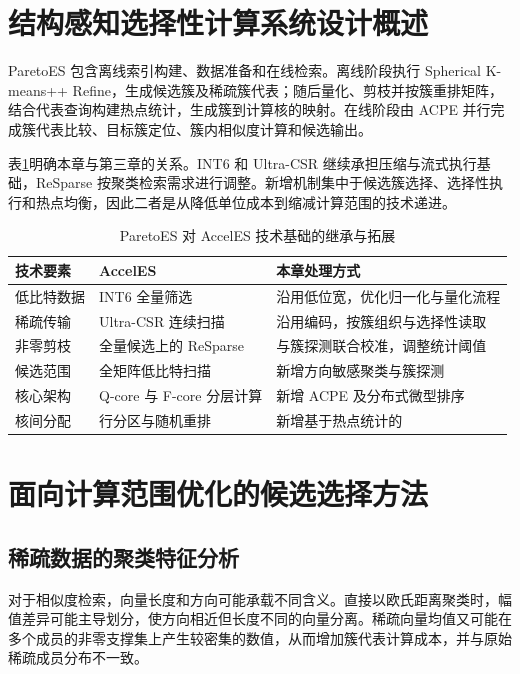 \section{结构感知选择性计算系统设计概述}
ParetoES 包含离线索引构建、数据准备和在线检索。离线阶段执行 Spherical K-means++ Refine，生成候选簇及稀疏簇代表；随后量化、剪枝并按簇重排矩阵，结合代表查询构建热点统计，生成簇到计算核的映射。在线阶段由 ACPE 并行完成簇代表比较、目标簇定位、簇内相似度计算和候选输出。


表\ref{tab:inheritance}明确本章与第三章的关系。INT6 和 Ultra-CSR 继续承担压缩与流式执行基础，ReSparse 按聚类检索需求进行调整。新增机制集中于候选簇选择、选择性执行和热点均衡，因此二者是从降低单位成本到缩减计算范围的技术递进。
\begin{table}[htbp]\centering
\caption{ParetoES 对 AccelES 技术基础的继承与拓展}\label{tab:inheritance}
\begin{tabularx}{\textwidth}{p{3cm}XX}\toprule
技术要素&AccelES&本章处理方式\\\midrule
低比特数据&INT6 全量筛选&沿用低位宽，优化归一化与量化流程\\
稀疏传输&Ultra-CSR 连续扫描&沿用编码，按簇组织与选择性读取\\
非零剪枝&全量候选上的 ReSparse&与簇探测联合校准，调整统计阈值\\
候选范围&全矩阵低比特扫描&新增方向敏感聚类与簇探测\\
核心架构&Q-core 与 F-core 分层计算&新增 ACPE 及分布式微型排序\\
核间分配&行分区与随机重排&新增基于热点统计的\hbalance{}\\\bottomrule
\end{tabularx}
\end{table}

\section{面向计算范围优化的候选选择方法}
\subsection{稀疏数据的聚类特征分析}
对于相似度检索，向量长度和方向可能承载不同含义。直接以欧氏距离聚类时，幅值差异可能主导划分，使方向相近但长度不同的向量分离。稀疏向量均值又可能在多个成员的非零支撑集上产生较密集的数值，从而增加簇代表计算成本，并与原始稀疏成员分布不一致。


